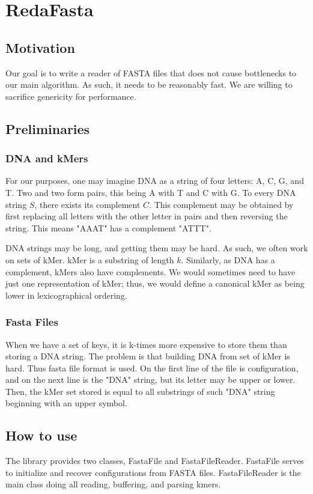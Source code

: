 \chapter{RedaFasta}
\section{Motivation}
Our goal is to write a reader of FASTA files that does not cause bottlenecks to our main algorithm. As such, it needs to be reasonably fast. We are willing to sacrifice genericity for performance. 

\section{Preliminaries}
\subsection{DNA and kMers}
For our purposes, one may imagine DNA as a string of four letters: A, C, G, and T. Two and two form pairs, this being A with T and C with G. To every DNA string $S$, there exists its complement $C$. This complement may be obtained by first replacing all letters with the other letter in pairs and then reversing the string. This means "AAAT" has a complement "ATTT".

DNA strings may be long, and getting them may be hard. As such, we often work on sets of kMer. kMer is a substring of length $k$. Similarly, as DNA has a complement, kMers also have complements. We would sometimes need to have just one representation of kMer; thus, we would define a canonical kMer as being lower in lexicographical ordering.

\subsection{Fasta Files}

When we have a set of keys, it is k-times more expensive to store them than storing a DNA string. The problem is that building DNA from set of kMer is hard. Thus fasta file format is used. On the first line of the file is configuration, and on the next line is the "DNA" string, but its letter may be upper or lower. Then, the kMer set stored is equal to all substrings of such "DNA" string beginning with an upper symbol. 

\section{How to use}
The library provides two classes, FastaFile and FastaFileReader. FastaFile serves to initialize and recover configurations from FASTA files. FastaFileReader is the main class doing all reading, buffering, and parsing kmers.


